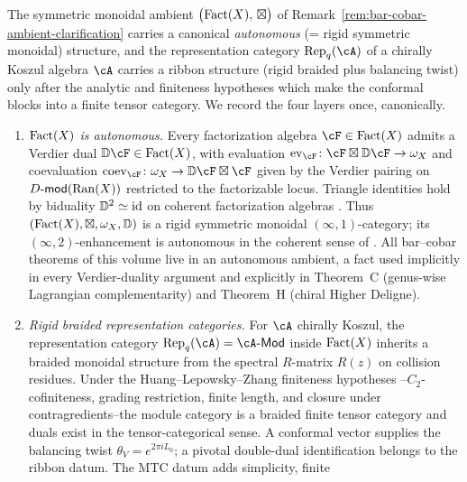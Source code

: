 \begin{remark}
\label{rem:rigid-tensor-structure-chir-alg}
The symmetric monoidal ambient
$\bigl(\mathrm{Fact}(X),\,\boxtimes\bigr)$ of
Remark~\ref{rem:bar-cobar-ambient-clarification} carries a canonical
\emph{autonomous} (= rigid symmetric monoidal) structure, and the
	representation category $\Repq(\cA)$ of a chirally Koszul algebra
	$\cA$ carries a ribbon structure (rigid braided plus balancing
	twist) only after the analytic and finiteness hypotheses which make
	the conformal blocks into a finite tensor category. We record the four layers
once, canonically.
\begin{enumerate}[label=\textup{(\alph*)}]
\item \emph{$\mathrm{Fact}(X)$ is autonomous.} Every factorization algebra
 $\cF \in \Fact(X)$ admits a Verdier dual $\mathbb{D}\cF \in
 \Fact(X)$, with evaluation
 $\ev_\cF\colon \cF \boxtimes \mathbb{D}\cF \to \omega_X$ and
 coevaluation
 $\coev_\cF\colon \omega_X \to \mathbb{D}\cF \boxtimes \cF$
 given by the Verdier pairing on $D\text{-}\mathsf{mod}(\mathrm{Ran}(X))$ restricted to the
 factorizable locus. Triangle identities hold by biduality
 $\mathbb{D}^2 \simeq \mathrm{id}$ on coherent factorization algebras
 \cite[IV.5.3]{GR17}. Thus
 $(\mathrm{Fact}(X),\boxtimes,\omega_X,\mathbb{D})$ is a rigid symmetric
 monoidal $(\infty,1)$-category; its $(\infty,2)$-enhancement is
 autonomous in the coherent sense of \cite{GR17}. All bar--cobar
 theorems of this volume live in an autonomous ambient, a fact
 used implicitly in every Verdier-duality argument and explicitly
 in Theorem~C (genus-wise Lagrangian complementarity) and
 Theorem~H (chiral Higher Deligne).
\item \emph{Rigid braided representation categories.} For $\cA$
 chirally Koszul, the representation
 category $\Repq(\cA) = \cA\text{-}\mathsf{Mod}$ inside
 $\mathrm{Fact}(X)$ inherits a braided monoidal structure from the spectral
 $R$-matrix $R(z)$ on collision residues. Under the
 Huang--Lepowsky--Zhang finiteness hypotheses
 \cite{HLZ14,Hua08}--$C_2$-cofiniteness, grading restriction,
 finite length, and closure under contragredients--the module
 category is a braided finite tensor category and duals exist in the
 tensor-categorical sense. A conformal vector supplies the balancing
 twist $\theta_V=e^{2\pi iL_0}$; a pivotal double-dual identification
 belongs to the ribbon datum. The MTC datum adds simplicity, finite

\end{enumerate}
\end{remark}
